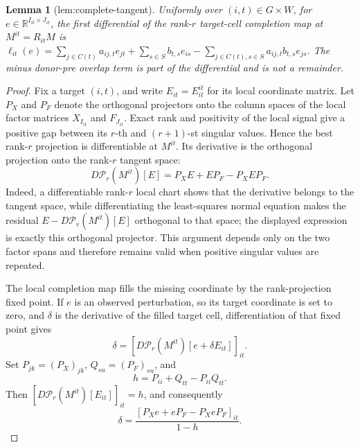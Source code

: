 \documentclass{article}
\newtheorem{lemma}{Lemma}
\begin{document}
\begin{lemma}[lem:complete-tangent]\label{lem:complete-tangent}
Uniformly over \((i,t)\in G\times W\), for \(e\in\mathbb R^{I_{it}\times J_{it}}\), the first differential of the rank-\(r\) target-cell completion map at \(M^{it}=R_{it}M\) is \(\ell_{it}(e)=\sum_{j\in C(t)}a_{ij,t}e_{jt}+\sum_{s\in S}b_{t,s}e_{is}-\sum_{j\in C(t),s\in S}a_{ij,t}b_{t,s}e_{js}\). The minus donor-pre overlap term is part of the differential and is not a remainder.
\end{lemma}
\begin{proof}
Fix a target \((i,t)\), and write \(E_{it}=E^{it}_{it}\) for its local coordinate matrix.  Let \(P_X\) and \(P_F\) denote the orthogonal projectors onto the column spaces of the local factor matrices \(X_{I_{it}}\) and \(F_{J_{it}}\).  Exact rank and positivity of the local signal give a positive gap between its \(r\)-th and \((r+1)\)-st singular values.  Hence the best rank-\(r\) projection is differentiable at \(M^{it}\).  Its derivative is the orthogonal projection onto the rank-\(r\) tangent space:
\[
 D\mathcal P_r(M^{it})[E]
 =P_XE+EP_F-P_XEP_F.
\]
Indeed, a differentiable rank-\(r\) local chart shows that the derivative belongs to the tangent space, while differentiating the least-squares normal equation makes the residual \(E-D\mathcal P_r(M^{it})[E]\) orthogonal to that space; the displayed expression is exactly this orthogonal projector.  This argument depends only on the two factor spans and therefore remains valid when positive singular values are repeated.

The local completion map fills the missing coordinate by the rank-projection fixed point.  If \(e\) is an observed perturbation, so its target coordinate is set to zero, and \(\delta\) is the derivative of the filled target cell, differentiation of that fixed point gives
\[
 \delta=\left[D\mathcal P_r(M^{it})[e+\delta E_{it}]\right]_{it}.
\]
Set \(P_{jk}=(P_X)_{jk}\), \(Q_{su}=(P_F)_{su}\), and
\[
 h=P_{ii}+Q_{tt}-P_{ii}Q_{tt}.
\]
Then \([D\mathcal P_r(M^{it})[E_{it}]]_{it}=h\), and consequently
\[
 \delta=\frac{[P_Xe+eP_F-P_XeP_F]_{it}}{1-h}.
\]


\end{proof}
\end{document}

